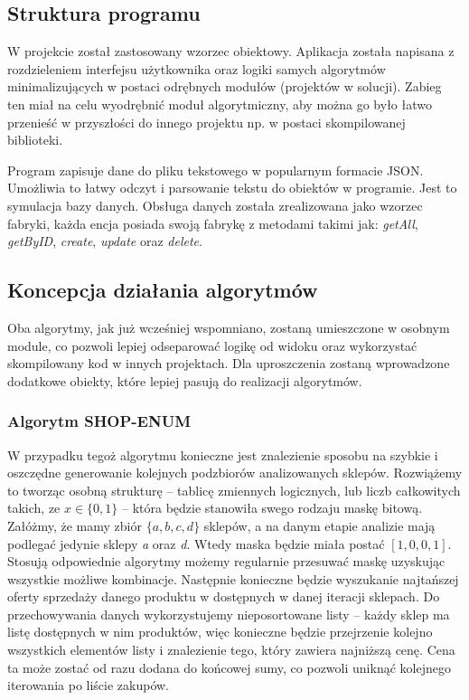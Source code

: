 \documentclass[a4paper]{article}
\begin{document}
\subsection{Struktura programu}
W projekcie został zastosowany wzorzec obiektowy. Aplikacja została napisana z rozdzieleniem interfejsu użytkownika oraz logiki samych algorytmów minimalizujących w postaci odrębnych modułów (projektów w solucji). Zabieg ten miał na celu wyodrębnić moduł algorytmiczny, aby można go było łatwo przenieść w przyszłości do innego projektu np. w postaci skompilowanej biblioteki.
\begin{flushleft}
Program zapisuje dane do pliku tekstowego w popularnym formacie JSON. Umożliwia to łatwy odczyt i parsowanie tekstu do obiektów w programie. Jest to symulacja bazy danych. Obsługa danych została zrealizowana jako wzorzec fabryki, każda encja posiada swoją fabrykę z metodami takimi jak: \textit{getAll}, \textit{getByID}, \textit{create}, \textit{update} oraz \textit{delete}.
\end{flushleft}
\subsection{Koncepcja działania algorytmów}
Oba algorytmy, jak już wcześniej wspomniano, zostaną umieszczone w osobnym module, co pozwoli lepiej odseparować logikę od widoku oraz wykorzystać skompilowany kod w innych projektach. Dla uproszczenia zostaną wprowadzone dodatkowe obiekty, które lepiej pasują do realizacji algorytmów. 
\subsubsection{Algorytm SHOP-ENUM}
W przypadku tegoż algorytmu konieczne jest znalezienie sposobu na szybkie i oszczędne generowanie kolejnych podzbiorów analizowanych sklepów. Rozwiążemy to tworząc osobną strukturę – tablicę zmiennych logicznych, lub liczb całkowitych takich, ze $x \in \{0, 1\}$ – która będzie stanowiła swego rodzaju maskę bitową. Załóżmy, że  mamy zbiór $\{a, b, c, d\}$ sklepów, a na danym etapie analizie mają podlegać jedynie sklepy \textit{a} oraz \textit{d}. Wtedy maska będzie miała postać $[1, 0, 0, 1]$. Stosują odpowiednie algorytmy możemy regularnie przesuwać maskę uzyskując wszystkie możliwe kombinacje. Następnie konieczne będzie wyszukanie najtańszej oferty sprzedaży danego produktu w dostępnych w danej iteracji sklepach. Do przechowywania danych wykorzystujemy nieposortowane listy – każdy sklep ma listę dostępnych w nim produktów, więc konieczne będzie przejrzenie kolejno wszystkich elementów listy i znalezienie tego, który zawiera najniższą cenę. Cena ta może zostać od razu dodana do końcowej sumy, co pozwoli uniknąć kolejnego iterowania po liście zakupów.
\end{document}
